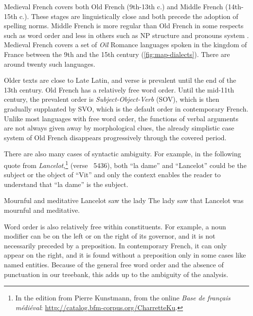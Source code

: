 Medieval French covers both Old French (9th-13th c.) and Middle French (14th-15th c.). These stages are linguistically close and both precede the adoption of spelling norms. Middle French is more regular than Old French in some respects such as word order \citep{GGHF2020GrandeGrammaireHist} and less in others such as NP structure and pronouns system \citep{marchello1979histoire}. Medieval French covers a set of \textit{Oïl} Romance languages spoken in the kingdom of France between the 9th and the 15th century (\cref{fig:map-dialects}).
There are around twenty such languages.

Older texts are close to Late Latin, and verse is prevalent until the end of the 13th century. Old French has a relatively free word order.
Until the mid-11th century, the prevalent order is \textit{Subject-Object-Verb} (SOV), which is then gradually supplanted by SVO, which is the default order in contemporary French.
Unlike most languages with free word order, the functions of verbal arguments are not always given away by morphological clues, the already simplistic %
case system of Old French disappears progressively through the covered period.

There are also many cases of syntactic ambiguity. For example, in the following quote from \emph{Lancelot},\footnote{In the edition from Pierre Kunstmann, from the online \textit{Base de français médiéval}: \url{http://catalog.bfm-corpus.org/CharretteKu}.} (verse ~5436),
both \enquote{la dame} and \enquote{Lancelot} could be the subject or the object of \enquote{Vit} and only the context enables the reader to understand that \enquote{la dame} is the subject.

        {Mournful and meditative Lancelot saw the lady}
        {The lady saw that Lancelot was mournful and meditative.}

Word order is also relatively free within constituents. For example, a noun modifier can be on the left or on the right of its governor, and it is not necessarily preceded by a preposition. In contemporary French, it can only appear on the right, and it is found without a preposition only in some cases like named entities. Because of the general free word order and the absence of punctuation in our treebank, this adds up to the ambiguity of the analysis.

